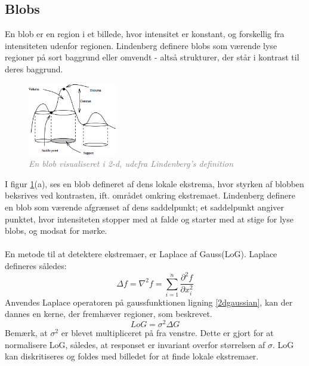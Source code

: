 \subsection{Blobs}
En blob er en region i et billede, hvor intensitet er konstant, og forskellig fra intensiteten udenfor regionen. Lindenberg \cite{blob} definere blobs som værende lyse regioner på sort baggrund eller omvendt - altså strukturer, der står i kontrast til deres baggrund. 

\begin{figure}[H]
    \centering
    \includegraphics[width=0.35\textwidth]{fig/11.png}
    \vspace{-0.5em}   
    \begin{center}
    \caption{\textcolor{gray}{\footnotesize \textit{
    En blob visualiseret i 2-d, udefra Lindenberg's definition \cite{blob}}}}
    \label{fig:lindblob}
     \end{center}
  \end{figure}
       \vspace{-2.7em}
\noindent
I figur \ref{fig:lindblob}(a), ses en blob defineret af dens lokale ekstrema, hvor styrken af blobben beksrives ved kontrasten, ift. området omkring ekstremaet. Lindenberg definere en blob som værende afgrænset af dens saddelpunkt; et saddelpunkt angiver punktet, hvor intensiteten stopper med at falde og starter med at stige for lyse blobs, og modsat for mørke.
\\
\\
En metode til at detektere ekstremaer, er Laplace af Gauss(LoG). Laplace defineres således:
\begin{equation}
\Delta f = \nabla^2 f =  \sum_{i = 1}^n \frac{\partial^2 f}{\partial x^2_i}
\end{equation}
Anvendes Laplace operatoren på gaussfunktionen ligning \eqref{2dgaussian}, kan der dannes en kerne, der fremhæver regioner, som beskrevet. 
\begin{equation}
LoG= \sigma^2\Delta G
\label{lap}
\end{equation}
Bemærk, at $\sigma^2$ er blevet multipliceret på fra venstre. Dette er gjort for at normalisere LoG, således, at responset er invariant overfor størrelsen af $\sigma$. LoG kan diskritiseres og foldes med billedet for at finde lokale ekstremaer. \\

